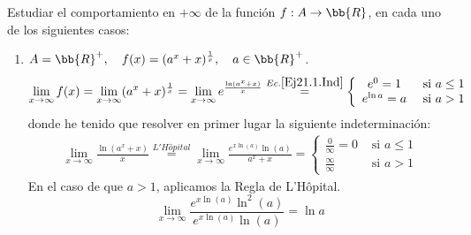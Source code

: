 \begin{ejercicio}
    Estudiar el comportamiento en $+\infty$ de la función $f:A\to \bb{R}$, en cada uno de los siguientes casos:
    \begin{enumerate}
    
        \item $A = \bb{R}^+,\quad f(x)=(a^x + x)^{\frac{1}{x}},\quad a\in \bb{R}^+$.
        \begin{equation*}
            \lim_{x\to\infty}f(x)
            = \lim_{x\to\infty}(a^x + x)^{\frac{1}{x}}
            = \lim_{x\to\infty}e^{\frac{\ln(a^x+x)}{x}}
            \stackrel{Ec. \ref{Ej21.1.Ind}}{=} \left\{ \begin{array}{cc}
                e^0=1 & \text{ si } a\leq1 \\
                e^{\ln{a}}=a & \text{ si } a>1
            \end{array}\right.
        \end{equation*}
        donde he tenido que resolver en primer lugar la siguiente indeterminación:
        \begin{multline}\label{Ej21.1.Ind}
            \lim_{x\to \infty}\frac{\ln(a^x+x)}{x}
            \stackrel{L'H\hat{o}pital}{=}
            \lim_{x\to \infty}\frac{e^{x\ln(a)}\ln(a)}{a^x+x} = \left\{ \begin{array}{cc}
                \frac{0}{\infty}=0 & \text{ si } a\leq1 \\
                \frac{\infty}{\infty} & \text{ si } a>1
            \end{array}\right.
        \end{multline}
        En el caso de que $a>1$, aplicamos la Regla de L'Hôpital.
        \begin{equation*}
            \lim_{x\to \infty}\frac{e^{x\ln(a)}\ln^2(a)}{e^{x\ln(a)}\ln(a)} = \ln a
        \end{equation*}
    

\end{enumerate}
\end{ejercicio}
